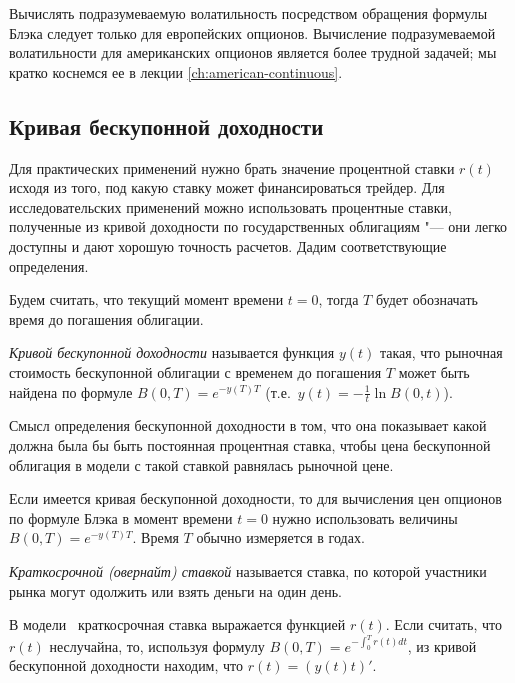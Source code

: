 \begin{remark}
Вычислять подразумеваемую волатильность посредством обращения формулы Блэка следует только для европейских опционов.
Вычисление подразумеваемой волатильности для американских опционов является более трудной задачей; мы кратко коснемся ее в лекции \ref{ch:american-continuous}.
\end{remark}


\subsection{Кривая бескупонной доходности}

Для практических применений нужно брать значение процентной ставки $r(t)$ исходя из того, под какую ставку может финансироваться трейдер.
Для исследовательских применений можно использовать процентные ставки, полученные из кривой доходности по государственных облигациям "--- они легко доступны и дают хорошую точность расчетов. 
Дадим соответствующие определения.

Будем считать, что текущий момент времени $t=0$, тогда $T$ будет обозначать время до погашения облигации. 

\begin{definition}
\emph{Кривой бескупонной доходности} называется функция $y(t)$ такая, что рыночная стоимость бескупонной облигации с временем до погашения $T$ может быть найдена по формуле $B(0,T) = e^{-y(T) T}$ (т.е.\ $y(t) = -\frac 1t \ln B(0,t)$).
\end{definition}

Смысл определения бескупонной доходности в том, что она показывает какой должна была бы быть постоянная процентная ставка, чтобы цена бескупонной облигация в модели с такой ставкой равнялась рыночной цене.

Если имеется кривая бескупонной доходности, то для вычисления цен опционов по формуле Блэка в момент времени $t=0$ нужно использовать величины $B(0,T) = e^{-y(T) T}$.
Время $T$ обычно измеряется в годах. 

\begin{remark}
\emph{Краткосрочной (овернайт) ставкой} называется ставка, по которой участники рынка могут одолжить или взять деньги на один день.

В модели \bs\ краткосрочная ставка выражается функцией $r(t)$. 
Если считать, что $r(t)$ неслучайна, то, используя формулу $B(0,T) = e^{-\int_0^T r(t) dt}$, из кривой бескупонной доходности находим, что $r(t) = (y(t)t)'$.
\end{remark}

